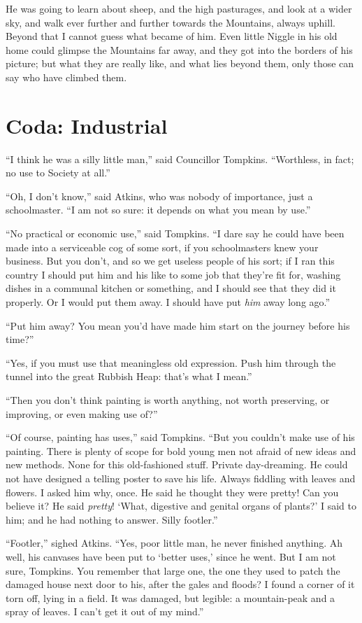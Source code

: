 He was going to learn about sheep, and the high pasturages, and look at a wider sky, and walk ever further and further towards the Mountains, always uphill. Beyond that I cannot guess what became of him. Even little Niggle in his old home could glimpse the Mountains far away, and they got into the borders of his picture; but what they are really like, and what lies beyond them, only those can say who have climbed them.

\section*{Coda: Industrial}

“I think he was a silly little man,” said Councillor Tompkins. “Worthless, in fact; no use to Society at all.”

“Oh, I don’t know,” said Atkins, who was nobody of importance, just a schoolmaster. “I am not so sure: it depends on what you mean by use.”

“No practical or economic use,” said Tompkins. “I dare say he could have been made into a serviceable cog of some sort, if you schoolmasters knew your business. But you don’t, and so we get useless people of his sort; if I ran this country I should put him and his like to some job that they’re fit for, washing dishes in a communal kitchen or something, and I should see that they did it properly. Or I would put them away. I should have put \emph{him} away long ago.”

“Put him away? You mean you’d have made him start on the journey before his time?”

“Yes, if you must use that meaningless old expression. Push him through the tunnel into the great Rubbish Heap: that’s what I mean.”

“Then you don’t think painting is worth anything, not worth preserving, or improving, or even making use of?”

“Of course, painting has uses,” said Tompkins. “But you couldn’t make use of his painting. There is plenty of scope for bold young men not afraid of new ideas and new methods. None for this old-fashioned stuff. Private day-dreaming. He could not have designed a telling poster to save his life. Always fiddling with leaves and flowers. I asked him why, once. He said he thought they were pretty! Can you believe it? He said \emph{pretty}! ‘What, digestive and genital organs of plants?’ I said to him; and he had nothing to answer. Silly footler.”

“Footler,” sighed Atkins. “Yes, poor little man, he never finished anything. Ah well, his canvases have been put to ‘better uses,’ since he went. But I am not sure, Tompkins. You remember that large one, the one they used to patch the damaged house next door to his, after the gales and floods? I found a corner of it torn off, lying in a field. It was damaged, but legible: a mountain-peak and a spray of leaves. I can’t get it out of my mind.”

